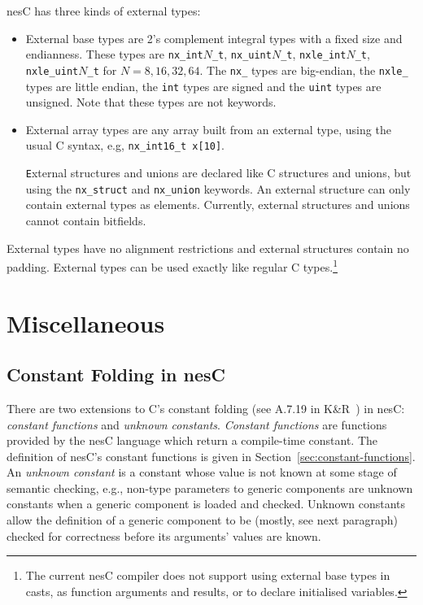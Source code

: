 \documentclass[11pt,letterpaper]{article}
\newcommand{\code}[1]{{\tt #1}}
\newcommand{\nesc}{nesC\xspace}
\begin{document}
\nesc has three kinds of external types:
\begin{itemize}
\item External base types are 2's complement integral types with a fixed
size and endianness. These types are \code{nx\_int$N$\_t},
\code{nx\_uint$N$\_t}, \code{nxle\_int$N$\_t}, \code{nxle\_uint$N$\_t} for $N =
8, 16, 32, 64$. The \code{nx\_} types are big-endian, the \code{nxle\_} types
are little endian, the \code{int} types are signed and the \code{uint}
types are unsigned. Note that these types are not keywords.

\item External array types are any array built from an external type, using 
the usual C syntax, e.g, \code{nx\_int16\_t x[10]}.

\code External structures and unions are declared like C structures and
unions, but using the \code{nx\_struct} and \code{nx\_union} keywords. An
external structure can only contain external types as elements. Currently,
external structures and unions cannot contain bitfields.
\end{itemize}

External types have no alignment restrictions and external structures
contain no padding. External types can be used exactly like regular C
types.\footnote{The current \nesc compiler does not support using external
base types in casts, as function arguments and results, or to declare
initialised variables.}

\section{Miscellaneous}
\label{sec:misc}

\subsection{Constant Folding in \nesc}
\label{sec:constant-folding}

There are two extensions to C's constant folding (see A.7.19 in
K\&R~\cite{kandr}) in \nesc: \emph{constant functions} and \emph{unknown
constants}. \emph{Constant functions} are functions provided by the \nesc
language which return a compile-time constant. The definition of \nesc's
constant functions is given in Section~\ref{sec:constant-functions}. An
\emph{unknown constant} is a constant whose value is not known at some
stage of semantic checking, e.g., non-type parameters to generic components
are unknown constants when a generic component is loaded and
checked. Unknown constants allow the definition of a generic component to
be (mostly, see next paragraph) checked for correctness before its
arguments' values are known.
\end{document}

